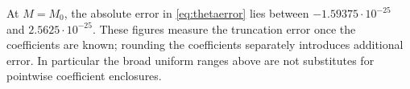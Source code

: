 At \(M=M_0\), the absolute error in \eqref{eq:thetaerror} lies between
\(-1.59375\cdot10^{-25}\) and \(2.5625\cdot10^{-25}\).
These figures measure the truncation error once the coefficients are
known; rounding the coefficients separately introduces additional
error. In particular the broad uniform ranges above are not substitutes
for pointwise coefficient enclosures.
